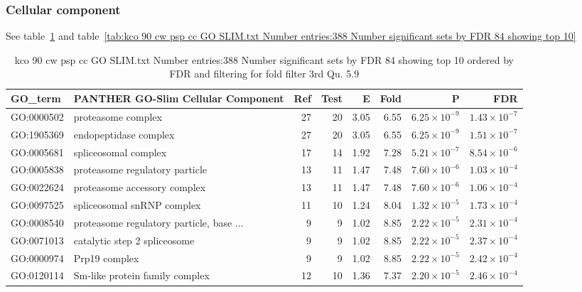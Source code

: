 \subsubsection{Cellular component}
See table~\ref{tab:kco 90 cw psp cc GO SLIM.txt Number entries:388 Number significant sets by FDR 84 showing top 10 ordered by FDR and filtering for fold filter 3rd Qu. 5.9} and table~\ref{tab:kco 90 cw psp cc GO SLIM.txt Number entries:388 Number significant sets by FDR 84 showing top 10}
\begin{table}[ht]
\centering
\begin{tabular}{llrrrrrr}
  \hline
GO\_term & PANTHER GO-Slim Cellular Component & Ref & Test & E & Fold & P & FDR \\ 
  \hline
GO:0000502 & proteasome complex  & 27 & 20 & 3.05 & 6.55 & $6.25 \times 10^{-9}$ & $1.43 \times 10^{-7}$ \\ 
  GO:1905369 & endopeptidase complex  & 27 & 20 & 3.05 & 6.55 & $6.25 \times 10^{-9}$ & $1.51 \times 10^{-7}$ \\ 
  GO:0005681 & spliceosomal complex  & 17 & 14 & 1.92 & 7.28 & $5.21 \times 10^{-7}$ & $8.54 \times 10^{-6}$ \\ 
  GO:0005838 & proteasome regulatory particle  & 13 & 11 & 1.47 & 7.48 & $7.60 \times 10^{-6}$ & $1.03 \times 10^{-4}$ \\ 
  GO:0022624 & proteasome accessory complex  & 13 & 11 & 1.47 & 7.48 & $7.60 \times 10^{-6}$ & $1.06 \times 10^{-4}$ \\ 
  GO:0097525 & spliceosomal snRNP complex  & 11 & 10 & 1.24 & 8.04 & $1.32 \times 10^{-5}$ & $1.73 \times 10^{-4}$ \\ 
  GO:0008540 & proteasome regulatory particle, base ... & 9 & 9 & 1.02 & 8.85 & $2.22 \times 10^{-5}$ & $2.31 \times 10^{-4}$ \\ 
  GO:0071013 & catalytic step 2 spliceosome  & 9 & 9 & 1.02 & 8.85 & $2.22 \times 10^{-5}$ & $2.37 \times 10^{-4}$ \\ 
  GO:0000974 & Prp19 complex  & 9 & 9 & 1.02 & 8.85 & $2.22 \times 10^{-5}$ & $2.42 \times 10^{-4}$ \\ 
  GO:0120114 & Sm-like protein family complex  & 12 & 10 & 1.36 & 7.37 & $2.20 \times 10^{-5}$ & $2.46 \times 10^{-4}$ \\ 
  \hline
\end{tabular}
\caption{kco 90 cw psp cc GO SLIM.txt Number entries:388 Number significant sets by FDR 84 showing top 10 ordered by FDR and filtering for fold filter 3rd Qu. 5.9} 
\label{tab:kco 90 cw psp cc GO SLIM.txt Number entries:388 Number significant sets by FDR 84 showing top 10 ordered by FDR and filtering for fold filter 3rd Qu. 5.9}
\end{table}
